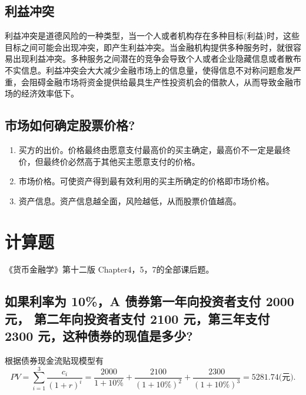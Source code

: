 \documentclass{article}
\begin{document}

\subsection{利益冲突}

利益冲突是道德风险的一种类型，当一个人或者机构存在多种目标(利益)时，这些目标之间可能会出现冲突，即产生利益冲突。当金融机构提供多种服务时，就很容易出现利益冲突。多种服务之间潜在的竞争会导致个人或者企业隐藏信息或者散布不实信息。利益冲突会大大减少金融市场上的信息量，使得信息不对称问题愈发严重，会阻碍金融市场将资金提供给最具生产性投资机会的借款人，从而导致金融市场的经济效率低下。

\subsection{市场如何确定股票价格?}
\begin{enumerate}
  \item 买方的出价。价格最终由愿意支付最高价的买主确定，最高价不一定是最终价，但最终价必然高于其他买主愿意支付的价格。
  \item 市场价格。可使资产得到最有效利用的买主所确定的价格即市场价格。
  \item 资产信息。资产信息越全面，风险越低，从而股票价值越高。
\end{enumerate}

\section{计算题}

《货币金融学》第十二版 Chapter4，5，7的全部课后题。

\subsection{如果利率为 10\%，A 债券第一年向投资者支付 2000 元， 第二年向投资者支付 2100 元，第三年支付 2300 元，这种债券的现值是多少?}

根据债券现金流贴现模型有
\begin{equation*}
    PV = \sum_{i=1}^3\frac{c_i}{(1+r)^i} = \frac{2000}{1+10\%} +\frac{2100}{(1+10\%)^2} +\frac{2300}{(1+10\%)^3} = 5281.74\text{(元)}.
\end{equation*}
   
\end{document}
